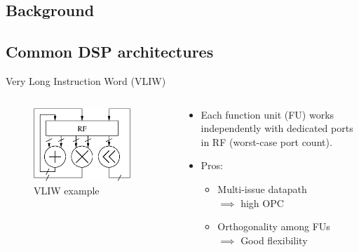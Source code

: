 \documentclass{beamer}
\begin{document}
\begin{CJK}{UTF8}{bkai}
    \section{Background}
    \subsection{Common DSP architectures}
    \begin{frame}{Very Long Instruction Word (VLIW)}
       \begin{columns}
           \begin{column}{0.4\textwidth}
               \begin{figure}[!ht]
                   \centering
                   \includegraphics[width=0.9\textwidth]{./figs/vliw.eps}
                   \caption{VLIW example}
               \end{figure}
           \end{column}
           \begin{column}{0.6\textwidth}
              \begin{itemize}
                  \item Each function unit (FU) works independently with dedicated ports in RF (worst-case port count).
                  \item Pros:
                      \begin{itemize}
                          \item Multi-issue datapath \\ $\implies$ high OPC
                          \item Orthogonality among FUs \\ $\implies$ Good flexibility

\end{itemize}
\end{itemize}
\end{column}
\end{columns}
\end{frame}
\end{CJK}
\end{document}
